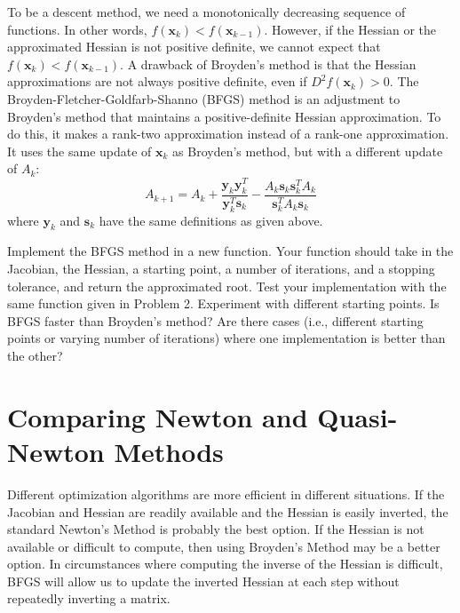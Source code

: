 To be a descent method, we need a monotonically decreasing sequence of functions. In other words, $f(\mathbf{x}_{k})<f(\mathbf{x}_{k-1})$. However, if the Hessian or the approximated Hessian is not positive definite, we cannot expect that $f(\mathbf{x}_{k})<f(\mathbf{x}_{k-1})$. A drawback of Broyden's method is that the Hessian approximations are not always positive definite, even if $D^2f(\mathbf{x}_k)>0$. The Broyden-Fletcher-Goldfarb-Shanno (BFGS) method is an adjustment to Broyden's method that maintains a positive-definite Hessian approximation. To do this, it makes a rank-two approximation instead of a rank-one approximation. It uses the same update of $\mathbf{x}_k$ as Broyden's method, but with a different update of $A_k$:
\begin{equation} \label{Eq:BFGSHessian}
A_{k+1} = A_k + \frac{\mathbf{y}_k\mathbf{y}_k^T}{\mathbf{y}_k^T\mathbf{s}_k}-\frac{A_k\mathbf{s}_k\mathbf{s}_k^TA_k}{\mathbf{s}_k^TA_k\mathbf{s}_k}
\end{equation}
where $\mathbf{y}_k$ and $\mathbf{s}_k$ have the same definitions as given above.

\begin{problem}
Implement the BFGS method in a new function. Your function should take in the Jacobian, the Hessian, a starting point, a number of iterations, and a stopping tolerance, and return the approximated root. Test your implementation with the same function given in Problem 2. Experiment with different starting points. Is BFGS faster than Broyden's method? Are there cases (i.e., different starting points or varying number of iterations) where one implementation is better than the other?
\end{problem}

\section*{Comparing Newton and Quasi-Newton Methods}

Different optimization algorithms are more efficient in different situations. If the
Jacobian and Hessian are readily available and the Hessian is easily inverted, the standard
Newton's Method is probably the best option. If the Hessian is not available or difficult to
compute, then using Broyden's Method may be a better option. In circumstances where computing
the inverse of the Hessian is difficult, BFGS will allow us to update the inverted Hessian
at each step without repeatedly inverting a matrix.

